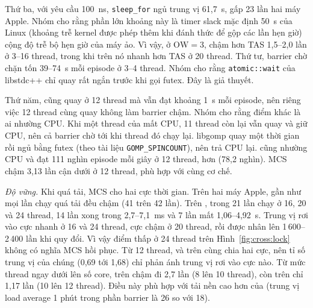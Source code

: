 Thứ ba, với yêu cầu 100~ns, \texttt{sleep\_for} ngủ trung vị 61,7~\textmu s, gấp 23 lần hai máy Apple.
Nhóm cho rằng phần lớn khoảng này là timer slack mặc định 50~\textmu s của Linux (khoảng trễ kernel được
phép thêm khi đánh thức để gộp các lần hẹn giờ) cộng độ trễ bộ hẹn giờ của máy ảo. Vì vậy, ở
$\mathrm{OW} = 3$,  chậm hơn TAS 1,5--2,0 lần ở 3--16 thread, trong khi trên
 nó nhanh hơn TAS ở 20 thread. Thứ tư, barrier chờ chặn tốn 39--74~\textmu s mỗi episode
ở 3--4 thread. Nhóm cho rằng \texttt{atomic::wait} của libstdc++ chỉ quay rất ngắn trước khi gọi futex.
Đây là giả thuyết.

Thứ năm,  cũng quay ở 12 thread mà vẫn đạt khoảng 1~\textmu s mỗi episode, nên riêng
việc 12 thread cùng quay không làm barrier chậm. Nhóm cho rằng điểm khác là ai nhường CPU. Khi một thread
của  mất CPU, 11 thread còn lại vẫn quay và giữ CPU, nên cả barrier chờ tới khi thread đó chạy
lại. libgomp quay một thời gian rồi ngủ bằng futex (theo tài liệu \texttt{GOMP\_SPINCOUNT}), nên trả CPU
lại.  cũng nhường CPU và đạt 111 nghìn episode mỗi giây ở 12 thread, hơn 
(78,2 nghìn). MCS chậm 3,13 lần cận dưới ở 12 thread, phù hợp với cùng cơ chế.

\emph{Độ vững.} Khi quá tải, MCS cho hai cực thời gian. Trên hai máy Apple, gần như mọi lần chạy quá tải
đều chậm (41 trên 42 lần). Trên , trong 21 lần chạy ở 16, 20 và 24 thread, 14 lần xong
trong 2,7--7,1~ms và 7 lần mất 1,06--4,92~s. Trung vị rơi vào cực nhanh ở 16 và 24 thread, cực chậm ở 20
thread, rồi được nhân lên 1\,600--2\,400 lần khi quy đổi. Vì vậy điểm thấp ở 24 thread trên
Hình~\ref{fig:cross:lock} không có nghĩa MCS hồi phục. Từ 12 thread,  và 
trên  cùng chia hai cực, nên tỉ số trung vị của chúng (0,69 tới 1,68) chỉ phản ánh
trung vị rơi vào cực nào. Từ mức thread ngay dưới lên số core,  trên  chậm
đi 2,7 lần (8 lên 10 thread), còn trên  chỉ 1,17 lần (10 lên 12 thread). Điều này phù
hợp với tải nền cao hơn của  (trung vị load average 1 phút trong phần barrier là 26 so
với 18).

